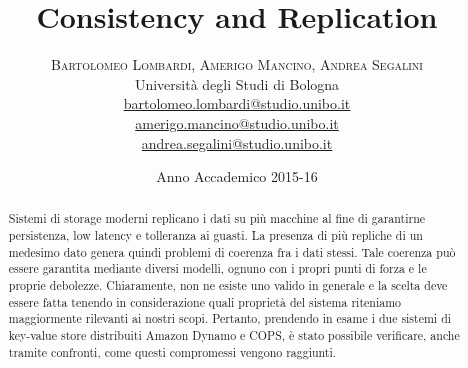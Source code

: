 \documentclass[twoside]{article}
\title{\vspace{-15mm}\fontsize{24pt}{10pt}\selectfont\textbf{Consistency and Replication}} %
\author{
\large
\textsc{Bartolomeo Lombardi, Amerigo Mancino, Andrea Segalini}\\[2mm] %
\normalsize Università degli Studi di Bologna %
\vspace{5mm} \\
\normalsize \href{mailto:bartolomeo.lombardi@studio.unibo.it}{bartolomeo.lombardi@studio.unibo.it}\\
\normalsize \href{mailto:amerigo.mancino@studio.unibo.it}{amerigo.mancino@studio.unibo.it}\\
\normalsize \href{mailto:andrea.segalini@studio.unibo.it}{andrea.segalini@studio.unibo.it}
\vspace{-5mm}
}
\date{Anno Accademico 2015-16}
\begin{document}
\maketitle 


\begin{abstract}
\noindent
Sistemi di storage moderni replicano i dati su più macchine al fine di garantirne persistenza, low latency e tolleranza ai guasti. La presenza di più repliche di un medesimo dato genera quindi problemi di coerenza fra i dati stessi. Tale coerenza può essere garantita mediante diversi modelli, ognuno con i propri punti di forza e le proprie debolezze. Chiaramente, non ne esiste uno valido in generale e la scelta deve essere fatta tenendo in considerazione quali proprietà del sistema riteniamo maggiormente rilevanti ai nostri scopi. Pertanto, prendendo in esame i due sistemi di key-value store distribuiti Amazon Dynamo e COPS, è stato possibile verificare, anche tramite confronti, come questi compromessi vengono raggiunti.
\end{abstract}


\vspace{20mm} %

\end{document}
